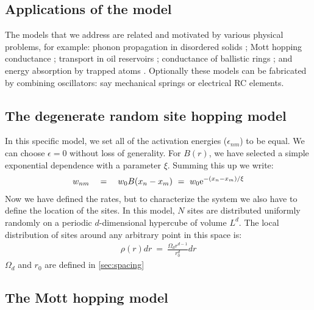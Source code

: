 \subsection{Applications of the model}



The models that we address are related and motivated  
by various physical problems, for example: 
phonon propagation in disordered solids \cite{phn1,phn2,amir}; 
Mott hopping conductance \cite{mott,miller,AHL,Halp,pollak,VRHbook};
transport in oil reservoirs \cite{aa1,aa2};
conductance of ballistic rings \cite{kbd};
and energy absorption by trapped atoms \cite{kbw}. 
%
Optionally these models can be fabricated by combining oscillators: 
say mechanical springs or electrical RC elements. 


\subsection{The degenerate random site hopping model} \label{sec:degenerate_random_hopping}

In this specific model, we set all of the activation energies ($\epsilon_{nm}$)
to be equal. We can choose $\epsilon=0$ without loss of generality. For $B(r)$, 
we have selected a simple exponential dependence with a parameter $\xi$.
Summing this up we write:
%
\begin{align}\label{eq:random_hopping_rates}
w_{nm} \quad = \quad w_0 B(x_n-x_m) \ = \ w_0 \mbox{e}^{-(x_n-x_m)/\xi}
\end{align}
%
Now we have defined the rates, but to characterize the system we also
have to define the location of the sites. In this model, $N$ sites are distributed
uniformly randomly on a periodic $d$-dimensional hypercube of volume $L^d$. The
local distribution of sites around any arbitrary point in this space is:
%
\begin{align}\label{eq:site_distribution}
\rho(r)dr \ =\ \frac{\Omega_d r^{d-1}}{r_0^d} dr
\end{align}
%
$\Omega_d$ and $r_0$ are defined in \autoref{sec:spacing}

\subsection{The Mott hopping model}\label{sec:mott_hopping}


